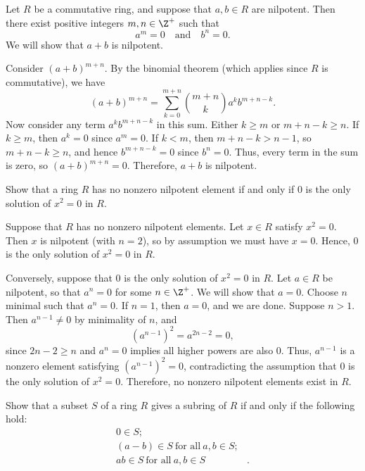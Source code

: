 \begin{solution}
  Let $R$ be a commutative ring, and suppose that $a,b \in R$ are nilpotent. Then there exist positive integers $m,n \in \Z^+$ such that
  \[%
    a^m = 0 \quad \text{and} \quad b^n = 0
  .\]%
  We will show that $a + b$ is nilpotent.

  Consider $(a + b)^{m+n}$. By the binomial theorem (which applies since $R$ is commutative), we have
  \[%
    (a+b)^{m+n} = \sum_{k=0}^{m+n} \binom{m+n}{k} a^k b^{m+n-k}
  .\]%
  Now consider any term $a^k b^{m+n-k}$ in this sum. Either $k \ge m$ or $m + n - k \ge n$. If $k \ge m$, then $a^k = 0$ since $a^m = 0$. If $k < m$, then $m + n - k > n-1$, so $m + n - k \ge n$, and hence $b^{m+n-k} = 0$ since $b^n = 0$. Thus, every term in the sum is zero, so $(a + b)^{m+n} = 0$. Therefore, $a + b$ is nilpotent.
\end{solution}

\begin{problem}[22.49]
  Show that a ring $R$ has no nonzero nilpotent element if and only if 0 is the only solution of $x^2 = 0$ in $R$.
\end{problem}

\begin{solution}
  Suppose that $R$ has no nonzero nilpotent elements. Let $x \in R$ satisfy $x^2 = 0$. Then $x$ is nilpotent (with $n = 2$), so by assumption we must have $x = 0$. Hence, $0$ is the only solution of $x^2 = 0$ in $R$.

  Conversely, suppose that $0$ is the only solution of $x^2 = 0$ in $R$. Let $a \in R$ be nilpotent, so that $a^n = 0$ for some $n \in \Z^+$. We will show that $a = 0$. Choose $n$ minimal such that $a^n = 0$. If $n = 1$, then $a = 0$, and we are done. Suppose $n > 1$. Then $a^{n-1} \neq 0$ by minimality of $n$, and
  \[%
    (a^{n-1})^2 = a^{2n-2} = 0
  ,\]%
  since $2n - 2 \ge n$ and $a^n = 0$ implies all higher powers are also $0$. Thus, $a^{n-1}$ is a nonzero element satisfying $(a^{n-1})^2 = 0$, contradicting the assumption that $0$ is the only solution of $x^2 = 0$. Therefore, no nonzero nilpotent elements exist in $R$.
\end{solution}

\begin{problem}[22.50]
  Show that a subset $S$ of a ring $R$ gives a subring of $R$ if and only if the following hold:
  \begin{align*}
    0 \in S;& \\
    (a - b) \in S~\text{for all}~a, b \in S;& \\
    ab \in S~\text{for all}~a, b \in S&
  .\end{align*}
\end{problem}

